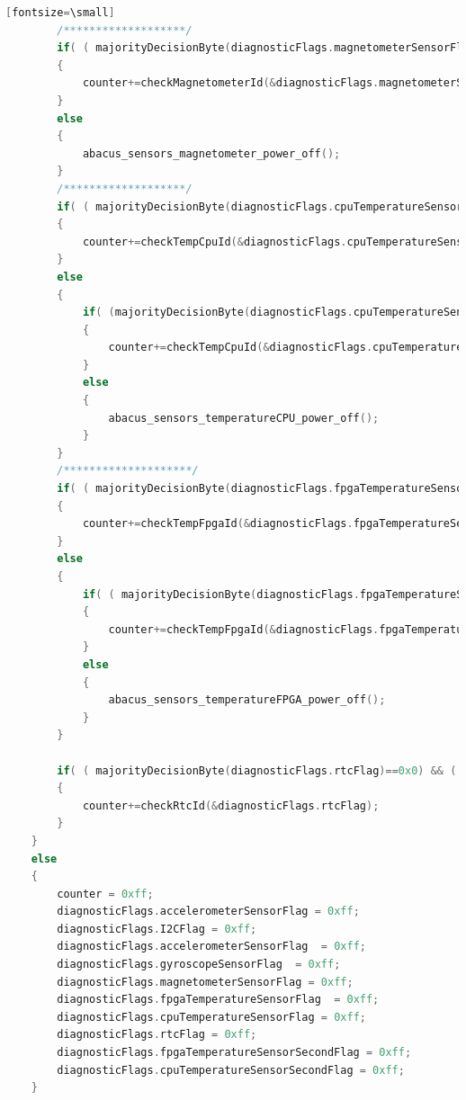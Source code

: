 \documentclass[LaM,binding=0.6cm]{../sapthesis}
\begin{document}
\begin{lstlisting}[language=c][fontsize=\small]
        /*******************/
        if( ( majorityDecisionByte(diagnosticFlags.magnetometerSensorFlag)==0x0)  && ( majorityDecisionByte(diagnosticFlags.I2CFlag) == 0x0 ) )
        {
            counter+=checkMagnetometerId(&diagnosticFlags.magnetometerSensorFlag);
        }
        else
        {
            abacus_sensors_magnetometer_power_off();
        }
        /*******************/
        if( ( majorityDecisionByte(diagnosticFlags.cpuTemperatureSensorFlag)==0x0)  && ( majorityDecisionByte(diagnosticFlags.I2CFlag) == 0x0 ) )
        {
            counter+=checkTempCpuId(&diagnosticFlags.cpuTemperatureSensorFlag);
        }
        else
        {
            if( (majorityDecisionByte(diagnosticFlags.cpuTemperatureSensorSecondFlag)==0x0)  && ( majorityDecisionByte(diagnosticFlags.I2CFlag) == 0x0 ) )
            {
                counter+=checkTempCpuId(&diagnosticFlags.cpuTemperatureSensorSecondFlag);
            }
            else
            {
                abacus_sensors_temperatureCPU_power_off();
            }
        }
        /********************/
        if( ( majorityDecisionByte(diagnosticFlags.fpgaTemperatureSensorFlag)==0x0) && ( majorityDecisionByte(diagnosticFlags.I2CFlag) == 0x0 ) )
        {
            counter+=checkTempFpgaId(&diagnosticFlags.fpgaTemperatureSensorFlag);
        }
        else
        {
            if( ( majorityDecisionByte(diagnosticFlags.fpgaTemperatureSensorSecondFlag)==0x0) && ( majorityDecisionByte(diagnosticFlags.I2CFlag) == 0x0 ) )
            {
                counter+=checkTempFpgaId(&diagnosticFlags.fpgaTemperatureSensorSecondFlag);
            }
            else
            {
                abacus_sensors_temperatureFPGA_power_off();
            }
        }

        if( ( majorityDecisionByte(diagnosticFlags.rtcFlag)==0x0) && ( majorityDecisionByte(diagnosticFlags.I2CFlag) == 0x0 ) )
        {
            counter+=checkRtcId(&diagnosticFlags.rtcFlag);
        }
    }
    else
    {
        counter = 0xff;
        diagnosticFlags.accelerometerSensorFlag = 0xff;
        diagnosticFlags.I2CFlag = 0xff;
        diagnosticFlags.accelerometerSensorFlag  = 0xff;
        diagnosticFlags.gyroscopeSensorFlag  = 0xff;
        diagnosticFlags.magnetometerSensorFlag = 0xff;
        diagnosticFlags.fpgaTemperatureSensorFlag  = 0xff;
        diagnosticFlags.cpuTemperatureSensorFlag = 0xff;
        diagnosticFlags.rtcFlag = 0xff;
        diagnosticFlags.fpgaTemperatureSensorSecondFlag = 0xff;
        diagnosticFlags.cpuTemperatureSensorSecondFlag = 0xff;
    }


\end{lstlisting}
\end{document}
